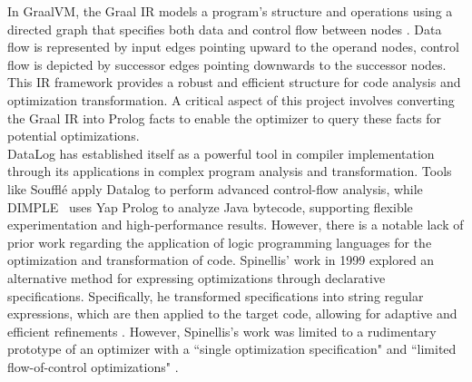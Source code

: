 In GraalVM, the Graal IR models a program's structure and operations using a directed graph that specifies both data and control flow between nodes \cite{Graal2021}. Data flow is represented by input edges pointing upward to the operand nodes, control flow is depicted by successor edges pointing downwards to the successor nodes. This IR framework provides a robust and efficient structure for code analysis and optimization transformation. A critical aspect of this project involves converting the Graal IR into Prolog facts to enable the optimizer to query these facts for potential optimizations. \\

DataLog has established itself as a powerful tool in compiler implementation through its applications in complex program analysis and transformation. 
Tools like Soufflé \cite{silverman2021wantanalyzeschemeprograms} apply Datalog to perform advanced control-flow analysis, while DIMPLE~\cite{Benton2007} uses Yap Prolog to analyze Java bytecode, supporting flexible experimentation and high-performance results.
However, there is a notable lack of prior work regarding the application of logic programming languages for the optimization and transformation of code. 
Spinellis’ work in 1999 explored an alternative method for expressing optimizations through declarative specifications. Specifically, he transformed specifications into string regular expressions, which are then applied to the target code, allowing for adaptive and efficient refinements \cite{Spinellis1999}. However, Spinellis’s work was limited to a rudimentary prototype of an optimizer with a ``single optimization specification" and ``limited flow-of-control optimizations" \cite{Spinellis1999}.
